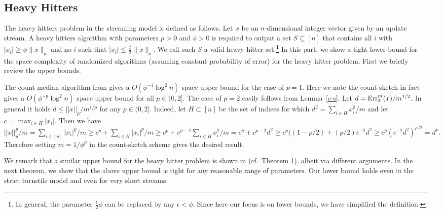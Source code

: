 \subsection{Heavy Hitters}\label{sec:hh}
The heavy hitters problem in the streaming model is defined as follows. Let
$x$ be an $n$-dimensional integer vector given by an update stream.
A heavy hitters algorithm with parameters $p>0$ and $\phi>0$ is
required to output a set $S\subseteq [n]$ that contains
all $i$ with $|x_i|\geq \phi\|x\|_p$ and no $i$ such
that $|x_i|\leq \frac{\phi}{2}\|x\|_p$. We call such $S$ a valid heavy hitter
set.\footnote{ In general, the parameter $\frac12\phi$
can be replaced by any $\epsilon < \phi$. 
 Since here our 
focus is on lower bounds, we have simplified the definition.} 
In this part, we show a tight lower bound for the
 space complexity of randomized algorithms (assuming
constant probability of error) for 
the heavy hitter problem. First we briefly review the upper bounds.

The count-median algorithm from \cite{CormodeM2005b} gives
 a $O(\phi^{-1}\log^2 n)$ space upper bound for the case of $p=1$.
Here we note the count-sketch \cite{CharikarCF2004} in fact 
gives a $O(\phi^{-p}\log^2 n)$ space upper bound for all $p \in (0,2]$.
The case of $p=2$ easily follows from Lemma~\ref{c-s}. Let $d=\operatorname{Err}^m_2(x)/m^{1/2}$.
In general it holds $d \le ||x||_p/m^{1/p}$ for any
$p\in(0,2]$. Indeed, let $H \subset [n]$ be the set of indices for which
$ d^2=\sum_{i\in H}x_i^2/m$ and let $c=\max_{i\in H}|x_i|$. Then we have
$||x||_p^p/m=\sum_{i\in[n]}|x_i|^p/m\ge c^p+\sum_{i\in H}|x_i|^p/m\ge
c^p+c^{p-2}\sum_{i\in
H}x_i^2/m=c^p+c^{p-2}d^2\ge c^p((1-p/2)+(p/2)c^{-2}d^2\ge
c^p(c^{-2}d^2)^{p/2}=d^p.$ Therefore setting $m=1/\phi^p$ in the count-sketch
scheme gives the desired result.


We remark that a similar upper bound for the heavy hitter problem is 
shown in \cite{KaneNPW2010} (cf.\ Theorem 1), albeit via different arguments.  
%
%
In the next theorem, we show that the above upper bound is tight for
any reasonable range of parameters. Our lower bound holds even in the strict
turnstile model and even for very short streams.

